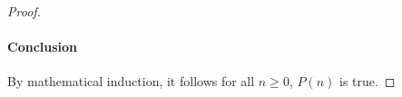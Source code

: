 \documentclass{article}
\begin{document}
\begin{proof}
  \paragraph{Conclusion}%

    By mathematical induction, it follows for all $n \geq 0$, $P(n)$ is true.

\end{proof}
\end{document}
